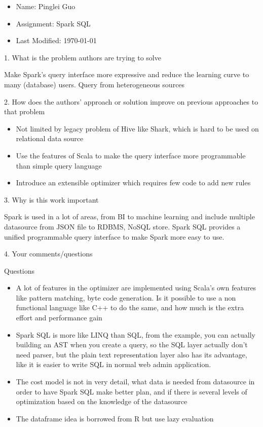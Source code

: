 \documentclass[12pt,a4paper,oneside]{article}
\begin{document}
\begin{itemize}
  \item Name: Pinglei Guo
  \item Assignment: Spark SQL
  \item Last Modified: \today
\end{itemize}

1. What is the problem authors are trying to solve

\medskip

Make Spark's query interface more expressive and reduce the learning curve to many (database) users.
Query from heterogeneous sources

\bigskip

2. How does the authors’ approach or solution improve on previous approaches to that problem

\medskip

\begin{itemize}
   \item Not limited by legacy problem of Hive like Shark, which is hard to be used on relational data source
   \item Use the features of Scala to make the query interface more programmable than simple query language
   \item Introduce an extensible optimizer which requires few code to add new rules
\end{itemize}

\bigskip

3. Why is this work important

\medskip

Spark is used in a lot of areas, from BI to machine learning and include multiple datasource from JSON file to
RDBMS, NoSQL store. Spark SQL provides a unified programmable query interface to make Spark more easy to use.

\bigskip

4. Your comments/questions

\medskip

Questions

\begin{itemize}
  \item A lot of features in the optimizer are implemented using Scala's own features like pattern matching, byte code generation.
  Is it possible to use a non functional language like C++ to do the same, and how much is the extra effort and performance gain
  \item Spark SQL is more like LINQ than SQL, from the example, you can actually building an AST when you create a query, so the
  SQL layer actually don't need parser, but the plain text representation layer also has its advantage, like it is easier to write
  SQL in normal web admin application.
  \item The cost model is not in very detail, what data is needed from datasource in order to have Spark SQL make better plan, and
  if there is several levels of optimization based on the knowledge of the datasource
  \item The dataframe idea is borrowed from R but use lazy evaluation
\end{itemize}
\end{document}
